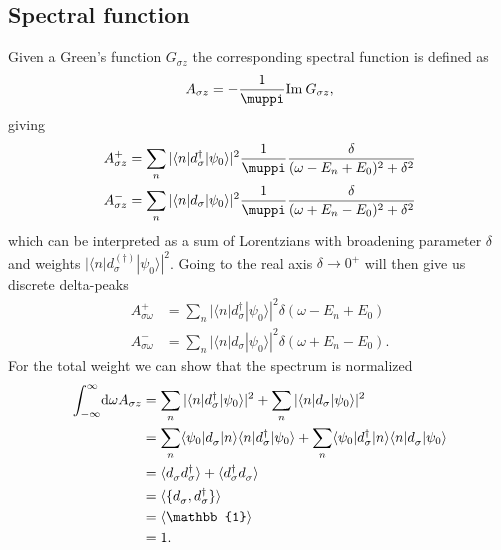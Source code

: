 \subsection{Spectral function}

Given a Green's function $G_{\sigma z}$ the corresponding spectral function is defined as
\begin{equation}
    A_{\sigma z} = -\frac{1}{\muppi}\Im G_{\sigma z},
\end{equation}
giving
\begin{subequations}
    \begin{align}
        A^+_{\sigma z}
         & =
        \sum_n |\langle n | d_\sigma^\dag | \psi_0\rangle|^2 \frac{1}{\muppi} \frac{\delta}{(\omega - E_n + E_0)^2 + \delta^2} \\
        A^-_{\sigma z}
         & =
        \sum_n |\langle n | d_\sigma | \psi_0\rangle|^2 \frac{1}{\muppi} \frac{\delta}{(\omega + E_n - E_0)^2 + \delta^2}
    \end{align}
\end{subequations}
which can be interpreted as a sum of Lorentzians with broadening parameter $\delta$
and weights $|\langle n | d_\sigma^{(\dag)} | \psi_0\rangle|^2$.
Going to the real axis $\delta\rightarrow0^+$ will then give us discrete delta-peaks
\begin{subequations}
    \begin{align}
        A^+_{\sigma\omega}
         & =
        \sum_n |\langle n | d_\sigma^\dag | \psi_0\rangle|^2 \delta(\omega - E_n + E_0) \\
        A^-_{\sigma\omega}
         & =
        \sum_n |\langle n | d_\sigma | \psi_0\rangle|^2 \delta(\omega + E_n - E_0).
    \end{align}
\end{subequations}
For the total weight we can show that the spectrum is normalized
\begin{align}
    \int_{-\infty}^\infty\! \md\omega A_{\sigma z}
     & =
    \sum_n |\langle n | d_\sigma^\dag | \psi_0\rangle|^2
    + \sum_n |\langle n | d_\sigma | \psi_0\rangle|^2                                              \\
     & =
    \sum_n \langle \psi_0 | d_\sigma^{\pdag} | n\rangle\langle n | d_\sigma^\dag | \psi_0\rangle
    + \sum_n \langle \psi_0 | d_\sigma^\dag | n\rangle\langle n | d_\sigma^{\pdag} | \psi_0\rangle \\
     & =
    \langle d_\sigma^{\pdag} d_\sigma^\dag\rangle + \langle d_\sigma^\dag d_\sigma^{\pdag}\rangle  \\
     & =
    \langle \{d_\sigma^{\pdag}, d_\sigma^\dag\}\rangle                                             \\
     & =
    \langle \mathbb{1}\rangle                                                                      \\
     & =
    1.
\end{align}


